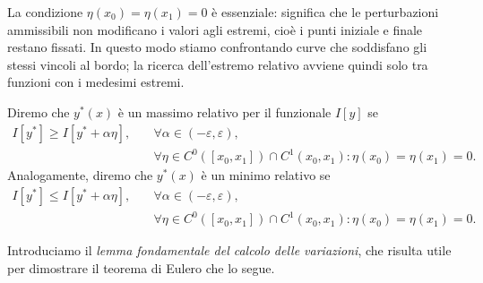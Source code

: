 La condizione $\eta(x_0)=\eta(x_1)=0$ è essenziale: significa che le perturbazioni ammissibili non modificano i valori agli estremi, cioè i punti iniziale e finale restano fissati. In questo modo stiamo confrontando curve che soddisfano gli stessi vincoli al bordo; la ricerca dell'estremo relativo avviene quindi solo tra funzioni con i medesimi estremi.

\begin{definition}
        Diremo che $y^*(x)$ è un massimo relativo per il funzionale $I[y]$ se
        \begin{align*}
            I[y^*] \geq I[y^* + \alpha \eta], \quad
            &\forall \alpha \in (-\varepsilon, \varepsilon), \\
            &\forall \eta \in C^0([x_0, x_1])\cap C^1(x_0, x_1): \eta(x_0) = \eta(x_1) = 0.
        \end{align*}
        Analogamente, diremo che $y^*(x)$ è un minimo relativo se
        \begin{align*}
            I[y^*] \leq I[y^* + \alpha \eta], \quad 
            &\forall \alpha \in (-\varepsilon, \varepsilon), \\
            &\forall \eta \in C^0([x_0, x_1])\cap C^1(x_0, x_1): \eta(x_0) = \eta(x_1) = 0.
        \end{align*}
\end{definition}

Introduciamo il \emph{lemma fondamentale del calcolo delle variazioni}, che risulta utile per dimostrare il teorema di Eulero che lo segue.

